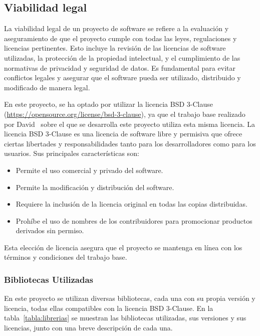 \subsection{Viabilidad legal}
La viabilidad legal de un proyecto de software se refiere a la evaluación y aseguramiento de que el proyecto cumple con todas las leyes, regulaciones y licencias pertinentes. Esto incluye la revisión de las licencias de software utilizadas, la protección de la propiedad intelectual, y el cumplimiento de las normativas de privacidad y seguridad de datos. Es fundamental para evitar conflictos legales y asegurar que el software pueda ser utilizado, distribuido y modificado de manera legal.

En este proyecto, se ha optado por utilizar la licencia BSD 3-Clause (\url{https://opensource.org/license/bsd-3-clause}), ya que el trabajo base realizado por David~\cite{TFG:David} sobre el que se desarrolla este proyecto utiliza esta misma licencia. La licencia BSD 3-Clause es una licencia de software libre y permisiva que ofrece ciertas libertades y responsabilidades tanto para los desarrolladores como para los usuarios. Sus principales características son:

\begin{itemize}
	\item Permite el uso comercial y privado del software.
	\item Permite la modificación y distribución del software.
	\item Requiere la inclusión de la licencia original en todas las copias distribuidas.
	\item Prohíbe el uso de nombres de los contribuidores para promocionar productos derivados sin permiso.

\end{itemize}

Esta elección de licencia asegura que el proyecto se mantenga en línea con los términos y condiciones del trabajo base.

\subsubsection{Bibliotecas Utilizadas}

En este proyecto se utilizan diversas bibliotecas, cada una con su propia versión y licencia, todas ellas compatibles con la licencia BSD 3-Clause. En la tabla~\ref{tabla:librerias} se muestran las bibliotecas utilizadas, sus versiones y sus licencias, junto con una breve descripción de cada una.

